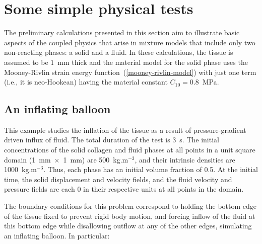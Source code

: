 \section{Some simple physical tests}
\label{simple-physics}

The preliminary calculations presented in this section aim to
illustrate basic aspects of the coupled physics that arise in mixture
models that include only two non-reacting phases: a solid and a
fluid. In these calculations, the tissue is assumed to be $1$~mm thick
and the material model for the solid phase uses the Mooney-Rivlin
strain energy function~(\ref{mooney-rivlin-model}) with just one term
(i.e., it is neo-Hookean) having the material constant \mbox{$C_{10} =
  0.8$~MPa.}

\subsection{An inflating balloon}
\label{balloon}

This example studies the inflation of the tissue as a result of
pressure-gradient driven influx of fluid.  The total duration of the
test is 3~s. The initial concentrations of the solid collagen and
fluid phases at all points in a unit square domain \mbox{(1~mm
  $\times$ 1~mm)} are 500~kg.m$^{-3}$, and their intrinsic densities
are 1000~kg.m$^{-3}$. Thus, each phase has an initial volume fraction
of 0.5. At the initial time, the solid displacement and velocity
fields, and the fluid velocity and pressure fields are each 0 in their
respective units at all points in the domain.

The boundary conditions for this problem correspond to holding the
bottom edge of the tissue fixed to prevent rigid body motion, and
forcing inflow of the fluid at this bottom edge while disallowing
outflow at any of the other edges, simulating an inflating balloon. In
particular:

